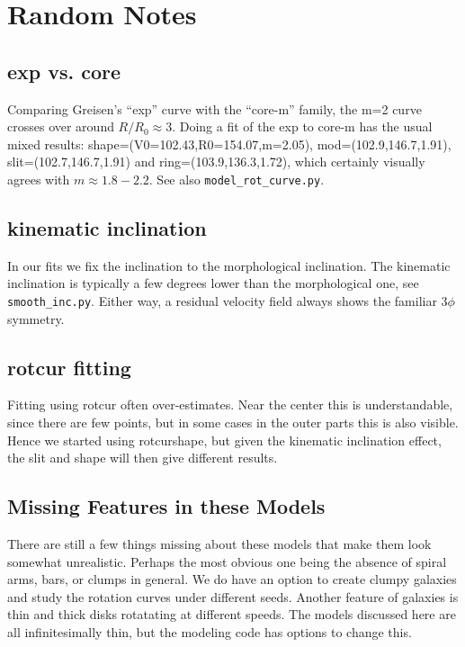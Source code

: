 \documentclass[12pt]{article}
\begin{document}
\section{Random Notes}

\subsection{exp vs. core}

Comparing Greisen's ``exp'' curve with the ``core-m'' family, the m=2 curve crosses over around $R/R_0 \approx 3$. Doing a fit
of the exp to core-m has the usual mixed results:   shape=(V0=102.43,R0=154.07,m=2.05),
mod=(102.9,146.7,1.91), slit=(102.7,146.7,1.91) and ring=(103.9,136.3,1.72), which certainly visually agrees with $m \approx 1.8-2.2$.
See also {\tt model\_rot\_curve.py}.

\subsection{kinematic inclination}

In our fits we fix the inclination to the morphological inclination. The kinematic inclination is typically a few degrees lower
than the morphological one, see {\tt smooth\_inc.py}. Either way, a residual velocity field always shows the familiar $3\phi$ symmetry.

\subsection{rotcur fitting}

Fitting using rotcur often over-estimates. Near the center this is understandable, since there are few points, but in some cases
in the outer parts this is also visible. Hence we started using rotcurshape, but given the kinematic inclination effect, the slit
and shape will then give different results.

\subsection{Missing Features in these Models}

There are still a few things missing about these models that make them look somewhat unrealistic.  Perhaps the most obvious one being
the absence of spiral arms, bars, or clumps in general. We do have an option to create clumpy galaxies and study the rotation curves
under different seeds.
Another feature of galaxies is thin and thick disks rotatating at
different speeds. The models discussed here are all infinitesimally thin, but the modeling code has options to change this.
\end{document}
